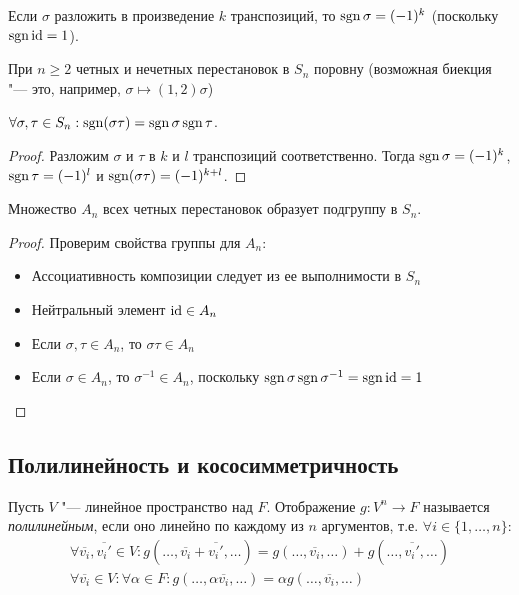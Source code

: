 \begin{corollary}
	Если $\sigma$ разложить в произведение $k$ транспозиций, то $\operatorname{sgn}\sigma = (-1)^k$ (поскольку $\operatorname{sgn}\mathrm{id} = 1$).
\end{corollary}

\begin{corollary}
	При $n \ge 2$ четных и нечетных перестановок в $S_n$ поровну (возможная биекция "--- это, например, $\sigma \mapsto (1, 2)\sigma$)
\end{corollary}

\begin{proposition}
	$\forall \sigma, \tau \in S_n: \operatorname{sgn}(\sigma\tau) = \operatorname{sgn}\sigma \operatorname{sgn}\tau$.
\end{proposition}

\begin{proof}
	Разложим $\sigma$ и $\tau$ в $k$ и $l$ транспозиций соответственно. Тогда $\operatorname{sgn}\sigma = (-1)^k$, $\operatorname{sgn}\tau = (-1)^l$ и $\operatorname{sgn}(\sigma\tau) = (-1)^{k + l}$.
\end{proof}

\begin{corollary}
	Множество $A_n$ всех четных перестановок образует подгруппу в $S_n$.
\end{corollary}

\begin{proof}
	Проверим свойства группы для $A_n$:
	\begin{itemize}
		\item Ассоциативность композиции следует из ее выполнимости в $S_n$
		\item Нейтральный элемент $\mathrm{id} \in A_n$
		\item Если $\sigma, \tau \in A_n$, то $\sigma\tau \in A_n$
		\item Если $\sigma \in A_n$, то $\sigma^{-1} \in A_n$, поскольку $\operatorname{sgn}\sigma \operatorname{sgn}\sigma^{-1} = \operatorname{sgn} \mathrm{id} = 1$
	\end{itemize}
\end{proof}

\subsection{Полилинейность и кососимметричность}

\begin{definition}
	Пусть $V$ "--- линейное пространство над $F$. Отображение $g: V^n \rightarrow F$ называется \textit{полилинейным}, если оно линейно по каждому из $n$ аргументов, т.\:е. $\forall i \in \{1, \dots, n\}$:
	\begin{gather*}
		\forall \overline{v_i}, \overline{v_i'} \in V: g(\dots, \overline{v_i} + \overline{v_i'}, \dots) = g(\dots, \overline{v_i}, \dots) + g(\dots, \overline{v_i'}, \dots)\\
		\forall \overline{v_i} \in V: \forall \alpha \in F: g(\dots, \alpha\overline{v_i}, \dots) = \alpha g(\dots, \overline{v_i}, \dots)
	\end{gather*}
\end{definition}

